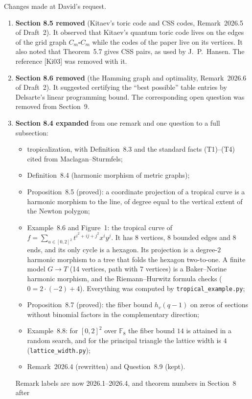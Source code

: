 \documentclass[12pt,letterpaper]{article}
\newcommand{\F}{\mathbb{F}}
\begin{document}
Changes made at David's request.
\begin{enumerate}[leftmargin=*]
\item \textbf{Section 8.5 removed} (Kitaev's toric code and CSS codes,
Remark~2026.5 of Draft~2). It observed that Kitaev's quantum toric code lives
on the edges of the grid graph $C_m\square C_m$ while the codes of the paper
live on its vertices. It also noted that Theorem~5.7 gives CSS pairs, as used
by J.~P.~Hansen. The reference [Ki03] was removed with it.
\item \textbf{Section 8.6 removed} (the Hamming graph and optimality,
Remark~2026.6 of Draft~2). It suggested certifying the ``best possible''
table entries by Delsarte's linear programming bound. The corresponding open
question was removed from Section~9.
\item \textbf{Section 8.4 expanded} from one remark and one question to a
full subsection:
\begin{itemize}[leftmargin=*,itemsep=0pt]
\item tropicalization, with Definition~8.3 and the standard facts (T1)--(T4)
cited from Maclagan--Sturmfels;
\item Definition~8.4 (harmonic morphism of metric graphs);
\item Proposition~8.5 (proved): a coordinate projection of a tropical curve
is a harmonic morphism to the line, of degree equal to the vertical extent of
the Newton polygon;
\item Example~8.6 and Figure~1: the tropical curve of
$f=\sum_{u\in[0,2]^2}t^{i^2+ij+j^2}x^iy^j$. It has $8$ vertices, $8$ bounded
edges and $8$ ends, and its only cycle is a hexagon. Its projection is a
degree-$2$ harmonic morphism to a tree that folds the hexagon two-to-one. A
finite model $G\to T$ (14 vertices, path with 7 vertices) is a Baker--Norine
harmonic morphism, and the Riemann--Hurwitz formula checks
($0=2\cdot(-2)+4$). Everything was computed by
\texttt{tropical\_example.py};
\item Proposition~8.7 (proved): the fiber bound $h_v(q-1)$ on zeros of
sections without binomial factors in the complementary direction;
\item Example~8.8: for $[0,2]^2$ over $\F_8$ the fiber bound $14$ is attained
in a random search, and for the principal triangle the lattice width is $4$
(\texttt{lattice\_width.py});
\item Remark~2026.4 (rewritten) and Question~8.9 (kept).
\end{itemize}
Remark labels are now 2026.1--2026.4, and theorem numbers in Section~8 after

\end{enumerate}
\end{document}
